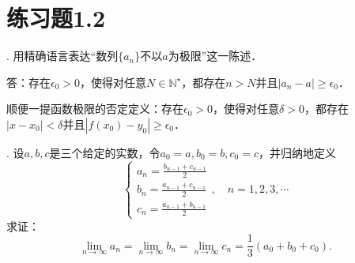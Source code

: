 \documentclass{ctexart}
\theoremstyle{definition}
\theoremstyle{definition}
\theoremstyle{plain}
\theoremstyle{plain}
\theoremstyle{plain}
\theoremstyle{definition}
\newcommand{\nat}{\mathbb{N}^\star}
\begin{document}
\section*{练习题1.2}
. 用精确语言表达``数列$\{a_n\}$不以$a$为极限''这一陈述．

\noindent 答：存在$\epsilon_0 > 0$，使得对任意$N \in \nat$，都存在$n > N$并且$|a_n - a| \geq \epsilon_0$．

\noindent 顺便一提函数极限的否定定义：存在$\epsilon_0 > 0$，使得对任意$\delta > 0$，都存在$|x - x_0| < \delta$并且$|f(x_0) - y_0| \geq \epsilon_0$．

. 设$a,b,c$是三个给定的实数，令$a_0 = a, b_0 = b, c_0 = c$，并归纳地定义
\begin{equation}
    \begin{cases}
        a_n = \displaystyle\frac{b_{n-1}+c_{n-1}}{2} \\
        b_n = \displaystyle\frac{a_{n-1}+c_{n-1}}{2} \\
        c_n = \displaystyle\frac{a_{n-1}+b_{n-1}}{2}
    \end{cases}, \quad n = 1,2,3,\cdots
\end{equation}
求证：
\begin{equation}
    \lim_{n\to\infty} a_n = \lim_{n\to\infty} b_n = \lim_{n\to\infty} c_n = \frac{1}{3} \left( a_0+b_0+c_0 \right).
\end{equation}
\end{document}
